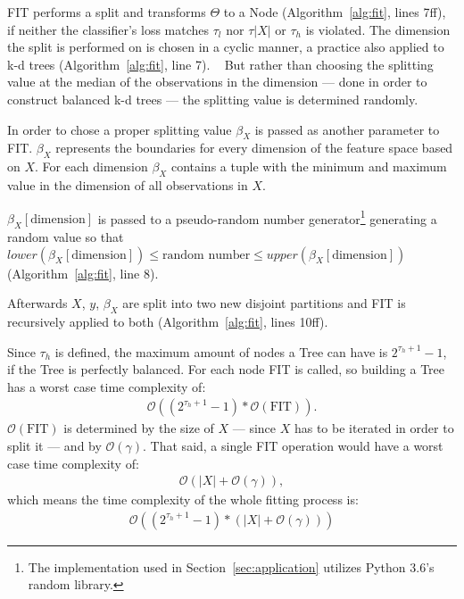 FIT performs a split and transforms $\Theta$ to a Node
(Algorithm~\ref{alg:fit}, lines 7ff), if neither the
classifier's loss matches $\tau_l$ nor $\tau{|X|}$ or
$\tau_h$ is violated. The dimension the split is performed
on is chosen in a cyclic manner, a practice also applied to
k-d trees (Algorithm~\ref{alg:fit}, line 7).%
~\cite{Brown2015kdtree}
But rather than choosing the splitting value at the median
of the observations in the dimension --- done in order to
construct balanced k-d trees --- the splitting value
is determined randomly.\cite{Brown2015kdtree}

In order to chose a proper splitting value $\beta_X$ is
passed as another parameter to FIT. $\beta_X$ represents
the boundaries for every dimension of the feature space
based on $X$. For each dimension $\beta_X$ contains a
tuple with the minimum and maximum value in the dimension
of all observations in $X$.

$\beta_X[\text{dimension}]$ is passed to a pseudo-random
number generator\footnote{The implementation used in
  Section~\ref{sec:application} utilizes Python 3.6's
  random library.\cite[chapter 9.6]{python}}
generating a random value so that
$lower(\beta_X[\text{dimension}]) \leq \text{random number}
\leq upper(\beta_X[\text{dimension}])$
(Algorithm~\ref{alg:fit}, line 8).

Afterwards $X$, $y$, $\beta_X$ are split into two new
disjoint partitions and FIT is recursively applied to both
(Algorithm~\ref{alg:fit}, lines 10ff).

Since $\tau_h$ is defined, the maximum amount of nodes a
Tree can have is $2^{\tau_h + 1} - 1$, if the Tree is
perfectly balanced.\cite[chapter 16.1]{Teschl} For each
node FIT is called, so building a Tree has a worst case
time complexity of:
\begin{align}
  \mathcal{O}((2^{\tau_h + 1} -1)*\mathcal{O}(\text{FIT})).
\end{align}
$\mathcal{O}(\text{FIT})$ is determined by the size of $X$
--- since $X$ has to be iterated in order to split it ---
and by $\mathcal{O}(\gamma)$. That said, a single FIT
operation would have a worst case time complexity of:
\begin{align}
  \mathcal{O}(|X| + \mathcal{O}(\gamma)),
\end{align} which means the time complexity of the whole
fitting process is:
\begin{align}
  \mathcal{O}((2^{\tau_h + 1} - 1) *
  (|X| + \mathcal{O}(\gamma)))
\label{eq:O_fit}
\end{align}

